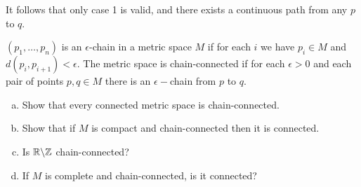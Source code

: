 \documentclass[a4paper, 12pt]{article}
\begin{document}
\begin{solution}
    It follows that only case 1 is valid, and there exists a continuous path from any $p$ to $q$.
\end{solution}

\begin{problem} [2.78]
$(p_1, \dots, p_n)$ is an $\epsilon$-chain in a metric space $M$ if for each $i$ we have $p_i \in M$ and $d(p_i, p_{i+1}) < \epsilon$. The metric space is chain-connected if for each $\epsilon > 0$ and each pair of points $p, q \in M$ there is an $\epsilon-$chain from $p$ to $q$.

\begin{enumerate} [(a)]
    \item Show that every connected metric space is chain-connected.
    \item Show that if $M$ is compact and chain-connected then it is connected.
    \item Is $\mathbb{R} \backslash \mathbb{Z}$ chain-connected?
    \item If $M$ is complete and chain-connected, is it connected?
\end{enumerate}
\end{problem}
\end{document}
